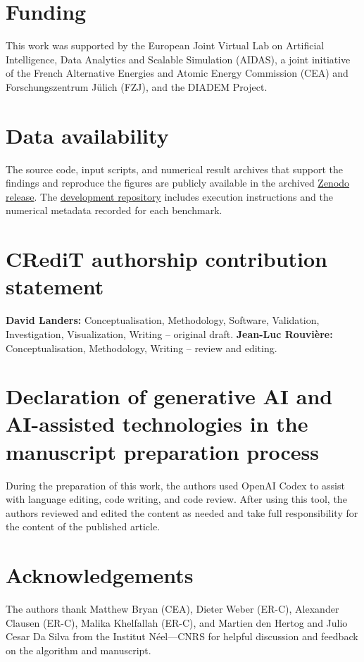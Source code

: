 \documentclass[preprint,12pt,number]{elsarticle}
\begin{document}
\section*{Funding}

This work was supported by the European Joint Virtual Lab on Artificial
Intelligence, Data Analytics and Scalable Simulation (AIDAS), a joint
initiative of the French Alternative Energies and Atomic Energy Commission
(CEA) and Forschungszentrum J\"ulich (FZJ), and the DIADEM Project.

\section*{Data availability}

The source code, input scripts, and numerical result archives that support the
findings and reproduce the figures are publicly available in the archived
\href{https://doi.org/10.5281/zenodo.21415469}{Zenodo release}. The
\href{https://github.com/DavidLanders95/WideAnglePropagation}{development
repository} includes execution instructions and the numerical metadata
recorded for each benchmark.

\section*{CRediT authorship contribution statement}

\textbf{David Landers:} Conceptualisation, Methodology, Software, Validation,
Investigation, Visualization, Writing --
original draft. \textbf{Jean-Luc Rouvi\`ere:} Conceptualisation, Methodology, Writing -- review and editing.

\section*{Declaration of generative AI and AI-assisted technologies in the
manuscript preparation process}

During the preparation of this work, the authors used OpenAI Codex to assist
with language editing, code writing, and code review. After using this tool,
the authors reviewed and edited the content as needed and take full
responsibility for the content of the published article.

\section*{Acknowledgements}

The authors thank Matthew Bryan (CEA), Dieter Weber (ER-C), Alexander Clausen (ER-C), Malika Khelfallah (ER-C), and Martien
den Hertog and Julio Cesar Da Silva from the Institut Néel—CNRS for helpful discussion and feedback on the algorithm and manuscript.


\end{document}

